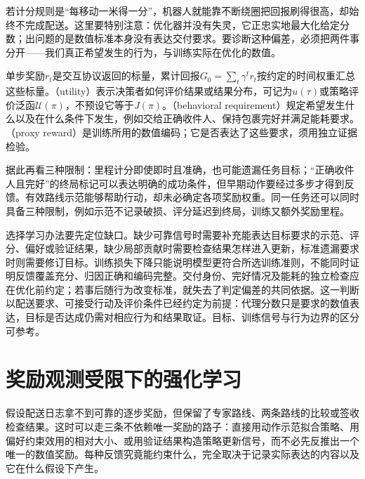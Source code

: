 若计分规则是“每移动一米得一分”，机器人就能靠不断绕圈把回报刷得很高，却始终不完成配送。这里要特别注意：优化器并没有失灵，它正忠实地最大化给定分数；出问题的是数值标准本身没有表达交付要求。要诊断这种偏差，必须把两件事分开——我们真正希望发生的行为，与训练实际在优化的数值。

\begin{definition}[奖励、回报、效用与行为要求]
  \label{def:rl-reward-objective}
  单步奖励$r_t$是交互协议返回的标量，累计回报$G_0=\sum_t\gamma^t r_t$按约定的时间权重汇总这些标量。（utility）表示决策者如何评价结果或结果分布，可记为$u(\tau)$或策略评价泛函$\mathcal U(\pi)$，不预设它等于$J(\pi)$。（behavioral requirement）规定希望发生什么以及在什么条件下发生，例如交给正确收件人、保持包裹完好并满足能耗要求。（proxy reward）是训练所用的数值编码；它是否表达了这些要求，须用独立证据检验。
\end{definition}

据此再看三种限制：里程计分即使即时且准确，也可能遗漏任务目标；“正确收件人且完好”的终局标记可以表达明确的成功条件，但早期动作要经过多步才得到反馈。有效路线示范能够帮助行动，却未必确定各项奖励权重。同一任务还可以同时具备三种限制，例如示范不记录破损、评分延迟到终局，训练又额外奖励里程。

选择学习办法要先定位缺口。缺少可靠信号时需要补充能表达目标要求的示范、评分、偏好或验证结果，缺少局部贡献时需要检查结果怎样进入更新，标准遗漏要求时则需要修订目标。训练损失下降只能说明模型更符合所选训练准则，不能同时证明反馈覆盖充分、归因正确和编码完整。交付身份、完好情况及能耗的独立检查应在优化前约定；若事后随行为改变标准，就失去了判定偏差的共同依据。这一判断以配送要求、可接受行动及评价条件已经约定为前提：代理分数只是要求的数值表达，目标是否达成仍需对相应行为和结果取证。目标、训练信号与行为边界的区分可参考。

\section{奖励观测受限下的强化学习}
\label{sec:rl-reward-alternative}

假设配送日志拿不到可靠的逐步奖励，但保留了专家路线、两条路线的比较或签收检查结果。这时可以走三条不依赖唯一奖励的路子：直接用动作示范拟合策略、用偏好约束效用的相对大小、或用验证结果构造策略更新信号，而不必先反推出一个唯一的数值奖励。每种反馈究竟能约束什么，完全取决于记录实际表达的内容以及它在什么假设下产生。

